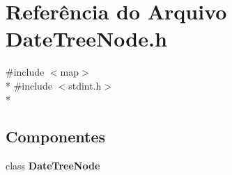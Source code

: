 \section{Referência do Arquivo Date\+Tree\+Node.\+h}
\label{_date_tree_node_8h}
{\ttfamily \#include $<$map$>$}\\*
{\ttfamily \#include $<$stdint.\+h$>$}\\*
\subsection*{Componentes}
\begin{DoxyCompactItemize}
\item 
class {\bf Date\+Tree\+Node}
\end{DoxyCompactItemize}
